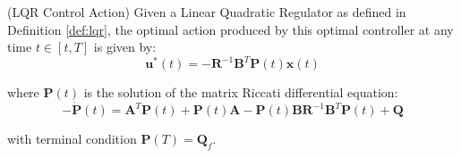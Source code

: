 \documentclass[a4paper,11pt]{book}
\numberwithin{figure}{chapter}
\numberwithin{equation}{chapter}
\numberwithin{table}{chapter}
\newtheorem{theorem}{Theorem}[chapter]
\theoremstyle{definition}
\newcounter{boxed-theorem}
\newenvironment{boxed-theorem}[1]
{\begin{shaded} \begin{theorem}{#1}}
{\end{theorem} \end{shaded}}
\newcounter{boxed-definition}
\begin{document}
\begin{boxed-theorem}{(LQR Control Action)} \label{th:LQRAction}
	Given a Linear Quadratic Regulator as defined in Definition \ref{def:lqr}, the optimal action produced by this optimal controller at any time $t \in [t, T]$ is given by:
	\begin{equation}
		\bm{u}^*(t) = - \bm{R}^{-1} \bm{B}^T \bm{P}(t) \bm{x}(t)
	\end{equation}
	
	\noindent where $\bm{P}(t)$ is the solution of the matrix Riccati differential equation:
	\begin{equation}
		-\dot{\bm{P}}(t) = \bm{A}^T \bm{P}(t) + \bm{P}(t) \bm{A} - \bm{P}(t) \bm{B} \bm{R}^{-1} \bm{B}^T \bm{P}(t) + \bm{Q}
	\end{equation}
	
	\noindent with terminal condition $\bm{P}(T) = \bm{Q}_f$.
\end{boxed-theorem}
\end{document}
